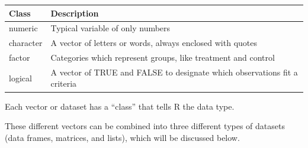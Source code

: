 \documentclass[]{book}
\theoremstyle{definition}
\theoremstyle{definition}
\theoremstyle{definition}
\theoremstyle{remark}
\begin{document}
\begin{longtable}[]{@{}ll@{}}
\toprule
\begin{minipage}[b]{0.45\columnwidth}\raggedright
Class\strut
\end{minipage} & \begin{minipage}[b]{0.49\columnwidth}\raggedright
Description\strut
\end{minipage}\tabularnewline
\midrule
\endhead
\begin{minipage}[t]{0.45\columnwidth}\raggedright
numeric\strut
\end{minipage} & \begin{minipage}[t]{0.49\columnwidth}\raggedright
Typical variable of only numbers\strut
\end{minipage}\tabularnewline
\begin{minipage}[t]{0.45\columnwidth}\raggedright
character\strut
\end{minipage} & \begin{minipage}[t]{0.49\columnwidth}\raggedright
A vector of letters or words, always enclosed with quotes\strut
\end{minipage}\tabularnewline
\begin{minipage}[t]{0.45\columnwidth}\raggedright
factor\strut
\end{minipage} & \begin{minipage}[t]{0.49\columnwidth}\raggedright
Categories which represent groups, like treatment and control\strut
\end{minipage}\tabularnewline
\begin{minipage}[t]{0.45\columnwidth}\raggedright
logical\strut
\end{minipage} & \begin{minipage}[t]{0.49\columnwidth}\raggedright
A vector of TRUE and FALSE to designate which observations fit a
criteria\strut
\end{minipage}\tabularnewline
\bottomrule
\end{longtable}

Each vector or dataset has a ``class'' that tells R the data type.

These different vectors can be combined into three different types of
datasets (data frames, matrices, and lists), which will be discussed
below.
\end{document}
